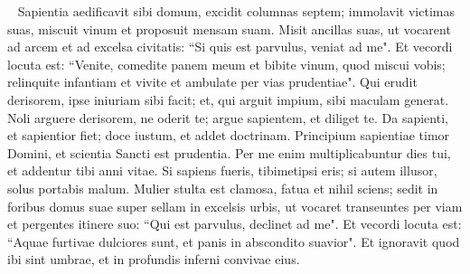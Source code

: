 \begin{biblechapter}   
\verse Sapientia aedificavit sibi domum, excidit columnas septem; 
\verse immolavit victimas suas, miscuit vinum et proposuit mensam suam. 
\verse Misit ancillas suas, ut vocarent ad arcem et ad excelsa civitatis: 
\verse “Si quis est parvulus, veniat ad me". Et vecordi locuta est: 
\verse “Venite, comedite panem meum et bibite vinum, quod miscui vobis;  
\verse relinquite infantiam et vivite et ambulate per vias prudentiae". 
\verse Qui erudit derisorem, ipse iniuriam sibi facit; et, qui arguit impium, sibi maculam generat. 
\verse Noli arguere derisorem, ne oderit te; argue sapientem, et diliget te. 
\verse Da sapienti, et sapientior fiet; doce iustum, et addet doctrinam. 
\verse Principium sapientiae timor Domini, et scientia Sancti est prudentia. 
\verse Per me enim multiplicabuntur dies tui, et addentur tibi anni vitae. 
\verse Si sapiens fueris, tibimetipsi eris; si autem illusor, solus portabis malum. 
\verse Mulier stulta est clamosa, fatua et nihil sciens; 
\verse sedit in foribus domus suae super sellam in excelsis urbis, 
\verse ut vocaret transeuntes per viam et pergentes itinere suo: 
\verse “Qui est parvulus, declinet ad me". Et vecordi locuta est: 
\verse “Aquae furtivae dulciores sunt, et panis in abscondito suavior". 
\verse Et ignoravit quod ibi sint umbrae, et in profundis inferni convivae eius. 
\end{biblechapter}

